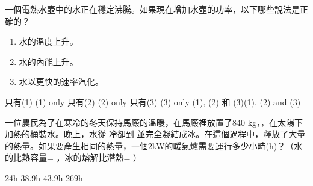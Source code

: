 {
    一個電熱水壺中的水正在穩定沸騰。如果現在增加水壺的功率，以下哪些說法是正確的？
    \begin{enumerate}[label=\sd]
        \item 水的溫度上升。
        \item 水的內能上升。
        \item 水以更快的速率汽化。
    \end{enumerate}
    \begin{choices}
        \choice 只有(1) \tab (1) only
        \choice 只有(2) \tab (2) only
        \CorrectChoice 只有(3) \tab (3) only
        \choice (1), (2) 和 (3)\tab (1), (2) and (3)
    \end{choices}
}{}

{
    一位農民為了在寒冷的冬天保持馬廄的溫暖，在馬廄裡放置了840 kg，，在太陽下加熱的桶裝水。晚上，水從 冷卻到 並完全凝結成冰。在這個過程中，釋放了大量的熱量。如果要產生相同的熱量，一個2kW的暖氣爐需要運行多少小時(h)？（水的比熱容量= ，冰的熔解比潛熱= ）
    \begin{choices}
        \choice 24h
        \choice 38.9h
        \CorrectChoice 43.9h
        \choice 269h
    \end{choices}
}{}
